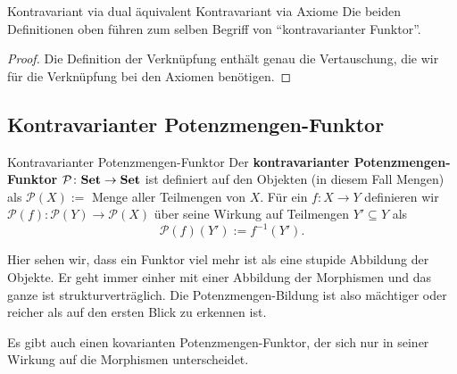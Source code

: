 \documentclass[a4paper]{amsart}
\theoremstyle{definition}
\newcommand{\PP}{\ensuremath{\mathcal{ P }}}
\newcommand{\Set}{\text{\textbf{Set}}}
\begin{document}
\begin{Satz}{Kontravariant via dual äquivalent Kontravariant via Axiome}
   Die beiden Definitionen oben führen zum selben Begriff von "`kontravarianter Funktor"'.
\end{Satz}
\begin{proof}
   Die Definition der Verknüpfung enthält genau die Vertauschung, die wir für die Verknüpfung bei den Axiomen benötigen.
\end{proof}

\subsection{Kontravarianter Potenzmengen-Funktor}
\begin{Definition}{Kontravarianter Potenzmengen-Funktor}
   Der \textbf{kontravarianter Potenzmengen-Funktor} $\PP \colon \Set \to \Set$ ist definiert auf den Objekten (in diesem Fall Mengen) als $\PP( X ) := $ Menge aller Teilmengen von $X$. Für ein $f \colon X \to Y$ definieren wir $\PP(f) \colon \PP(Y) \to \PP(X)$ über seine Wirkung auf Teilmengen $Y' \subseteq Y$ als
   \begin{equation}
      \PP(f)(Y') := f^{-1}(Y').
   \end{equation}
\end{Definition}
Hier sehen wir, dass ein Funktor viel mehr ist als eine stupide Abbildung der Objekte. Er geht immer einher mit einer Abbildung der Morphismen und das ganze ist strukturverträglich. Die Potenzmengen-Bildung ist also mächtiger oder reicher als auf den ersten Blick zu erkennen ist.

Es gibt auch einen kovarianten Potenzmengen-Funktor, der sich nur in seiner Wirkung  auf die Morphismen unterscheidet.

\end{document}
